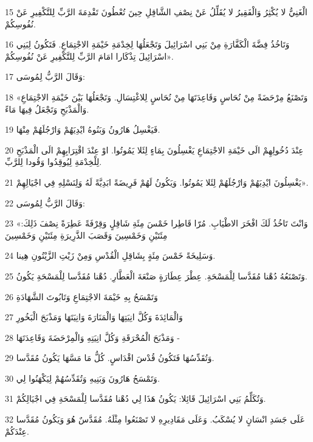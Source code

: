 \par 15 الْغَنِيُّ لا يُكْثِرُ وَالْفَقِيرُ لا يُقَلِّلُ عَنْ نِصْفِ الشَّاقِلِ حِينَ تُعْطُونَ تَقْدِمَةَ الرَّبِّ لِلتَّكْفِيرِ عَنْ نُفُوسِكُمْ.
\par 16 وَتَاخُذُ فِضَّةَ الْكَفَّارَةِ مِنْ بَنِي اسْرَائِيلَ وَتَجْعَلُهَا لِخِدْمَةِ خَيْمَةِ الاجْتِمَاعِ. فَتَكُونُ لِبَنِي اسْرَائِيلَ تِذْكَارا امَامَ الرَّبِّ لِلتَّكْفِيرِ عَنْ نُفُوسِكُمْ».
\par 17 وَقَالَ الرَّبُّ لِمُوسَى:
\par 18 «وَتَصْنَعُ مِرْحَضَةً مِنْ نُحَاسٍ وَقَاعِدَتَهَا مِنْ نُحَاسٍ لِلاغْتِسَالِ. وَتَجْعَلُهَا بَيْنَ خَيْمَةِ الاجْتِمَاعِ وَالْمَذْبَحِ وَتَجْعَلُ فِيهَا مَاءً.
\par 19 فَيَغْسِلُ هَارُونُ وَبَنُوهُ ايْدِيَهُمْ وَارْجُلَهُمْ مِنْهَا.
\par 20 عِنْدَ دُخُولِهِمْ الَى خَيْمَةِ الاجْتِمَاعِ يَغْسِلُونَ بِمَاءٍ لِئَلا يَمُوتُوا. اوْ عِنْدَ اقْتِرَابِهِمْ الَى الْمَذْبَحِ لِلْخِدْمَةِ لِيُوقِدُوا وَقُودا لِلرَّبِّ.
\par 21 يَغْسِلُونَ ايْدِيَهُمْ وَارْجُلَهُمْ لِئَلا يَمُوتُوا. وَيَكُونُ لَهُمْ فَرِيضَةً ابَدِيَّةً لَهُ وَلِنَسْلِهِ فِي اجْيَالِهِمْ».
\par 22 وَقَالَ الرَّبُّ لِمُوسَى:
\par 23 «وَانْتَ تَاخُذُ لَكَ افْخَرَ الاطْيَابِ. مُرّا قَاطِرا خَمْسَ مِئَةِ شَاقِلٍ وَقِرْفَةً عَطِرَةً نِصْفَ ذَلِكَ: مِئَتَيْنِ وَخَمْسِينَ وَقَصَبَ الذَّرِيرَةِ مِئَتَيْنِ وَخَمْسِينَ
\par 24 وَسَلِيخَةً خَمْسَ مِئَةٍ بِشَاقِلِ الْقُدْسِ وَمِنْ زَيْتِ الزَّيْتُونِ هِينا.
\par 25 وَتَصْنَعُهُ دُهْنا مُقَدَّسا لِلْمَسْحَةِ. عِطْرَ عِطَارَةٍ صَنْعَةَ الْعَطَّارِ. دُهْنا مُقَدَّسا لِلْمَسْحَةِ يَكُونُ.
\par 26 وَتَمْسَحُ بِهِ خَيْمَةَ الاجْتِمَاعِ وَتَابُوتَ الشَّهَادَةِ
\par 27 وَالْمَائِدَةَ وَكُلَّ انِيَتِهَا وَالْمَنَارَةَ وَانِيَتَهَا وَمَذْبَحَ الْبَخُورِ
\par 28 وَمَذْبَحَ الْمُحْرَقَةِ وَكُلَّ انِيَتِهِ وَالْمِرْحَضَةَ وَقَاعِدَتَهَا -
\par 29 وَتُقَدِّسُهَا فَتَكُونُ قُدْسَ اقْدَاسٍ. كُلُّ مَا مَسَّهَا يَكُونُ مُقَدَّسا.
\par 30 وَتَمْسَحُ هَارُونَ وَبَنِيهِ وَتُقَدِّسُهُمْ لِيَكْهَنُوا لِي.
\par 31 وَتُكَلِّمُ بَنِي اسْرَائِيلَ قَائِلا: يَكُونُ هَذَا لِي دُهْنا مُقَدَّسا لِلْمَسْحَةِ فِي اجْيَالِكُمْ.
\par 32 عَلَى جَسَدِ انْسَانٍ لا يُسْكَبُ. وَعَلَى مَقَادِيرِهِ لا تَصْنَعُوا مِثْلَهُ. مُقَدَّسٌ هُوَ وَيَكُونُ مُقَدَّسا عِنْدَكُمْ.
